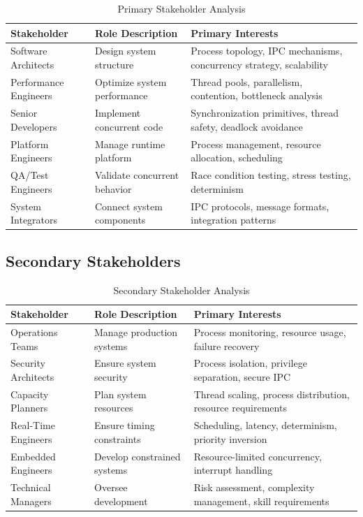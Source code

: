 \documentclass[11pt,letterpaper]{article}
\begin{document}
\begin{table}[H]
\centering
\caption{Primary Stakeholder Analysis}
\small
\begin{tabular}{@{}L{2.6cm}L{3.6cm}L{7cm}@{}}
\toprule
\textbf{Stakeholder} & \textbf{Role Description} & \textbf{Primary Interests} \\
\midrule
Software Architects & Design system structure & Process topology, IPC mechanisms, concurrency strategy, scalability \\
\addlinespace
Performance Engineers & Optimize system performance & Thread pools, parallelism, contention, bottleneck analysis \\
\addlinespace
Senior Developers & Implement concurrent code & Synchronization primitives, thread safety, deadlock avoidance \\
\addlinespace
Platform Engineers & Manage runtime platform & Process management, resource allocation, scheduling \\
\addlinespace
QA/Test Engineers & Validate concurrent behavior & Race condition testing, stress testing, determinism \\
\addlinespace
System Integrators & Connect system components & IPC protocols, message formats, integration patterns \\
\bottomrule
\end{tabular}
\end{table}

\subsection{Secondary Stakeholders}

\begin{table}[H]
\centering
\caption{Secondary Stakeholder Analysis}
\small
\begin{tabular}{@{}L{2.6cm}L{3.6cm}L{7cm}@{}}
\toprule
\textbf{Stakeholder} & \textbf{Role Description} & \textbf{Primary Interests} \\
\midrule
Operations Teams & Manage production systems & Process monitoring, resource usage, failure recovery \\
\addlinespace
Security Architects & Ensure system security & Process isolation, privilege separation, secure IPC \\
\addlinespace
Capacity Planners & Plan system resources & Thread scaling, process distribution, resource requirements \\
\addlinespace
Real-Time Engineers & Ensure timing constraints & Scheduling, latency, determinism, priority inversion \\
\addlinespace
Embedded Engineers & Develop constrained systems & Resource-limited concurrency, interrupt handling \\
\addlinespace
Technical Managers & Oversee development & Risk assessment, complexity management, skill requirements \\
\bottomrule
\end{tabular}
\end{table}
\end{document}
